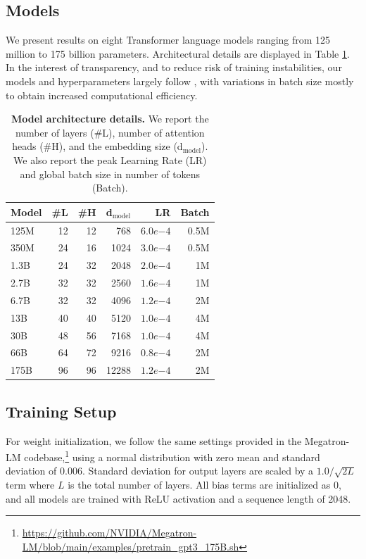 \documentclass[11pt]{article}
\begin{document}
\subsection{Models}
\label{sec:models}

We present results on eight Transformer language models ranging from 125 million to 175 billion parameters. Architectural details are displayed in Table \ref{tab:model_sizes}. In the interest of transparency, and to reduce risk of training instabilities, our models and hyperparameters largely follow \citet{brown2020gpt3}, with variations in batch size mostly to obtain increased computational efficiency.

\begin{table}[t]
    \centering
    \begin{tabular}{lrrrrr}
    \toprule
    {\bf Model} & {\bf \#L} & {\bf \#H}  & {\bf d$_{\text{model}}$} & {\bf LR} & {\bf Batch} \\
    \midrule
        125M    & 12 & 12 & 768   & $6.0e{-4}$ & 0.5M \\
        350M    & 24 & 16 & 1024  & $3.0e{-4}$ & 0.5M \\
        1.3B    & 24 & 32 & 2048  & $2.0e{-4}$ & 1M \\
        2.7B    & 32 & 32 & 2560  & $1.6e{-4}$ & 1M \\
        6.7B    & 32 & 32 & 4096  & $1.2e{-4}$ & 2M \\
        13B     & 40 & 40 & 5120  & $1.0e{-4}$ & 4M \\
        30B     & 48 & 56 & 7168  & $1.0e{-4}$ & 4M \\
        66B     & 64 & 72 & 9216  & $0.8e{-4}$ & 2M \\
        175B    & 96 & 96 & 12288 & $1.2e{-4}$ & 2M\\
    \bottomrule
    \end{tabular}
    \caption{{\bf Model architecture details.} We report the number of layers (\#L),
    number of attention heads (\#H), and the embedding size ({d$_{\text{model}}$}).
    We also report the peak Learning Rate (LR) and global batch size in number of tokens (Batch).
    }
    \label{tab:model_sizes}
\end{table}
\subsection{Training Setup}
\label{sec:training_setup}
For weight initialization, we follow the same settings provided in the Megatron-LM codebase,\footnote{\url{https://github.com/NVIDIA/Megatron-LM/blob/main/examples/pretrain_gpt3_175B.sh}} using a normal distribution with zero mean and standard deviation of 0.006.  Standard deviation for output layers are scaled by a $1.0/\sqrt{2 L}$ term where $L$ is the total number of layers. All bias terms are initialized as 0, and all models are trained with ReLU activation and a sequence length of 2048.
\end{document}
